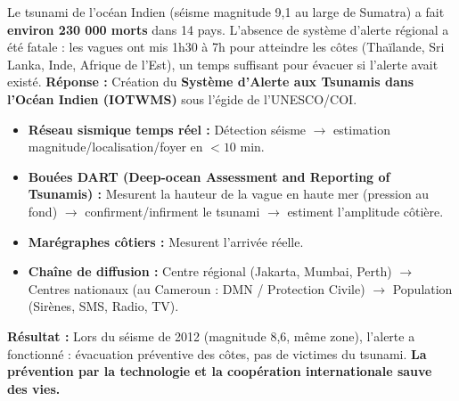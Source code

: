 \documentclass[11pt]{article}
\begin{document}
\begin{savaistu}
Le tsunami de l'océan Indien (séisme magnitude 9,1 au large de Sumatra) a fait \textbf{environ 230 000 morts} dans 14 pays. L'absence de système d'alerte régional a été fatale : les vagues ont mis 1h30 à 7h pour atteindre les côtes (Thaïlande, Sri Lanka, Inde, Afrique de l'Est), un temps suffisant pour évacuer si l'alerte avait existé.
\medskip
\noindent \textbf{Réponse :} Création du \textbf{Système d'Alerte aux Tsunamis dans l'Océan Indien (IOTWMS)} sous l'égide de l'UNESCO/COI.
\begin{itemize}
    \item \textbf{Réseau sismique temps réel :} Détection séisme $\rightarrow$ estimation magnitude/localisation/foyer en $< 10$ min.
    \item \textbf{Bouées DART (Deep-ocean Assessment and Reporting of Tsunamis) :} Mesurent la hauteur de la vague en haute mer (pression au fond) $\rightarrow$ confirment/infirment le tsunami $\rightarrow$ estiment l'amplitude côtière.
    \item \textbf{Marégraphes côtiers :} Mesurent l'arrivée réelle.
    \item \textbf{Chaîne de diffusion :} Centre régional (Jakarta, Mumbai, Perth) $\rightarrow$ Centres nationaux (au Cameroun : DMN / Protection Civile) $\rightarrow$ Population (Sirènes, SMS, Radio, TV).
\end{itemize}
\textbf{Résultat :} Lors du séisme de 2012 (magnitude 8,6, même zone), l'alerte a fonctionné : évacuation préventive des côtes, pas de victimes du tsunami. \textbf{La prévention par la technologie et la coopération internationale sauve des vies.}
\end{savaistu}
\end{document}
